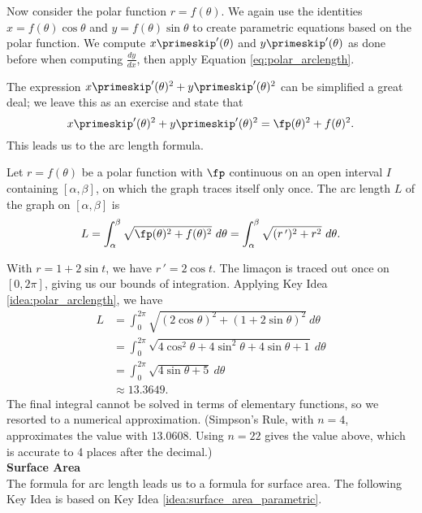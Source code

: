 Now consider the polar function $r=f(\theta)$. We again use the identities $x=f(\theta)\cos\theta$ and $y=f(\theta)\sin\theta$ to create parametric equations based on the polar function. We compute $x\primeskip'(\theta)$ and $y\primeskip'(\theta)$ as done before when computing $\frac{dy}{dx}$, then apply Equation \eqref{eq:polar_arclength}.

The expression $x\primeskip'(\theta)^2+y\primeskip'(\theta)^2$ can be simplified a great deal; we leave this as an exercise and state that $$x\primeskip'(\theta)^2+y\primeskip'(\theta)^2 = \fp(\theta)^2+f(\theta)^2.$$ This leads us to the  arc length formula.

{Let  $r=f(\theta)$ be a polar function with $\fp$ continuous on an open interval $I$ containing $[\alpha,\beta]$, on which the graph traces itself only once. The arc length $L$ of the graph on $[\alpha,\beta]$ is
$$L = \int_\alpha^\beta \sqrt{\fp(\theta)^2+f(\theta)^2}\ d\theta = \int_\alpha^\beta\sqrt{(r\,')^2+ r^2}\ d\theta.$$
}

{With $r=1+2\sin t$, we have $r\,' = 2\cos t$. The lima\c con is traced out once on $[0,2\pi]$, giving us our bounds of integration. Applying Key Idea \ref{idea:polar_arclength}, we have
\begin{align*}
L 	&= \int_0^{2\pi} \sqrt{(2\cos\theta)^2+(1+2\sin\theta)^2}\ d\theta \\
		&=	\int_0^{2\pi} \sqrt{4\cos^2\theta+4\sin^2\theta +4\sin\theta+1}\ d\theta\\
		&=	\int_0^{2\pi} \sqrt{4\sin\theta+5}\ d\theta\\
		&\approx 13.3649.
\end{align*}
The final integral cannot be solved in terms of elementary functions, so we resorted to a numerical approximation. (Simpson's Rule, with $n=4$, approximates the value with $13.0608$. Using $n=22$ gives the value above, which is accurate to 4 places after the decimal.) 
}\\

\noindent\textbf{\large Surface Area}\\

The formula for arc length leads us to a formula for surface area. The following Key Idea is based on Key Idea \ref{idea:surface_area_parametric}.

